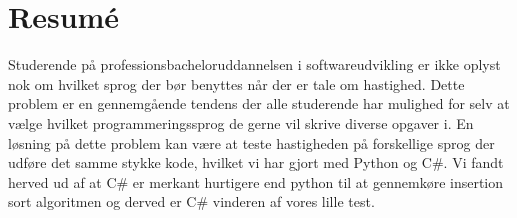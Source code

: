\documentclass[class=report, crop=false]{standalone}
\begin{document}
    \section{Resumé}
    Studerende på professionsbacheloruddannelsen i softwareudvikling er ikke oplyst nok om hvilket sprog der bør benyttes når der er tale om hastighed.
    Dette problem er en gennemgående tendens der alle studerende har mulighed for selv at vælge hvilket programmeringssprog de gerne vil skrive diverse opgaver i.
    En løsning på dette problem kan være at teste hastigheden på forskellige sprog der udføre det samme stykke kode, hvilket vi har gjort med Python og C\#.
    Vi fandt herved ud af at C\# er merkant hurtigere end python til at gennemkøre insertion sort algoritmen og derved er C\# vinderen af vores lille test.
\end{document}
